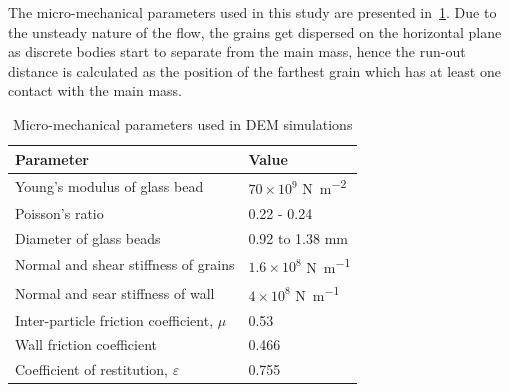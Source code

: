 The micro-mechanical parameters used in this study are presented 
in~\cref{table:DEM_data}. Due to the unsteady nature of the flow, the 
grains get dispersed on the horizontal plane as discrete bodies start to 
separate from the main mass, hence the run-out distance is calculated as the 
position of the farthest grain which has at least one contact with the main 
mass.

\begin{table}
\caption{Micro-mechanical parameters used in DEM simulations}
\label{table:DEM_data}
\centering
\begin{tabular}{ll}
\toprule
\textbf{Parameter} & \textbf{Value} \\ \midrule
Young's modulus of glass bead & $70\times10^{9}$ \si{\newton\per\m\squared}\\ 
Poisson's ratio & 0.22 - 0.24\\ 
Diameter of glass beads & 0.92 to 1.38 \si{\mm}\\
Normal and shear stiffness of grains & $1.6 \times 10^{8}$ \si{\newton\per\m}\\ 
Normal and sear stiffness of wall & $4 \times 10^{8}$ \si{\newton\per\m}\\
Inter-particle friction coefficient, $\mu$ & 0.53 \\
Wall friction coefficient & 0.466 \\ 
Coefficient of restitution, $\varepsilon$ & 0.755 \\ \bottomrule
\end{tabular}
\end{table}

